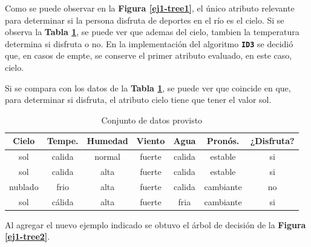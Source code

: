 \documentclass[a4paper]{article}
\newcommand{\bold}[1]{\textbf{\texttt{#1}}}
\newcommand{\reffig}[1]{\textbf{Figura \ref{#1}}}
\newcommand{\reftable}[1]{\textbf{Tabla \ref{#1}}}
\begin{document}
Como se puede observar en la \reffig{ej1-tree1}, el único atributo relevante para determinar si la persona disfruta de deportes en el río es el cielo. Si se observa la \reftable{tab:dataset-1}, se puede ver que ademas del cielo, tambien la temperatura determina si disfruta o no. En la implementación del algoritmo \bold{ID3} se decidió que, en casos de empte, se conserve el primer atributo evaluado, en este caso, cielo.

Si se compara con los datos de la \reftable{tab:dataset-1}, se puede ver que coincide en que, para determinar si disfruta, el atributo cielo tiene que tener el valor sol.

\begin{table}[h]
  \centering
  \begin{tabular}{ccccccc}
  Cielo                          & Tempe. & Humedad & Viento & Agua   & Pronós.    & ¿Disfruta?                \\ \hline
  {\color[HTML]{009901} sol}     & calida & normal  & fuerte & calida & estable   & {\color[HTML]{009901} si} \\
  {\color[HTML]{009901} sol}     & calida & alta    & fuerte & calida & estable   & {\color[HTML]{009901} si} \\
  {\color[HTML]{CB0000} nublado} & frio   & alta    & fuerte & calida & cambiante & {\color[HTML]{CB0000} no} \\
  {\color[HTML]{009901} sol}     & cálida & alta    & fuerte & fria   & cambiante & {\color[HTML]{009901} si}
  \end{tabular}
  \caption{Conjunto de datos provisto}
  \label{tab:dataset-1}
  \end{table}

Al agregar el nuevo ejemplo indicado se obtuvo el árbol de decisión de la \reffig{ej1-tree2}.
\end{document}
